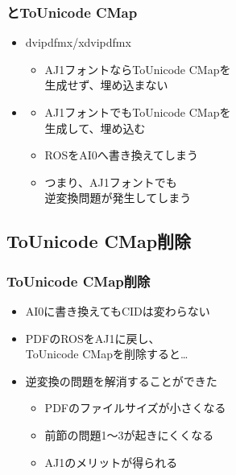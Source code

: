 \begin{frame}\frametitle{\LuaTeX とToUnicode CMap}
  \begin{itemize}
  \item dvipdfmx/xdvipdfmx
    \begin{itemize}
    \item AJ1フォントならToUnicode CMapを \\
      生成せず、埋め込まない
    \end{itemize}
  \item \LuaTeX
    \begin{itemize}
    \item AJ1フォントでもToUnicode CMapを \\
      生成して、埋め込む
    \item ROSをAI0へ書き換えてしまう
    \item つまり、AJ1フォントでも \\
      逆変換問題が発生してしまう
    \end{itemize}
  \end{itemize}
\end{frame}

\subsection{ToUnicode CMap削除}
\begin{frame}\frametitle{ToUnicode CMap削除}
  \begin{itemize}
  \item AI0に書き換えてもCIDは変わらない
  \item PDFのROSをAJ1に戻し、 \\
    ToUnicode CMapを削除すると…
  \item 逆変換の問題を解消することができた
    \begin{itemize}
      \item PDFのファイルサイズが小さくなる
      \item 前節の問題1～3が起きにくくなる
      \item AJ1のメリットが得られる
    \end{itemize}
  \end{itemize}
\end{frame}

